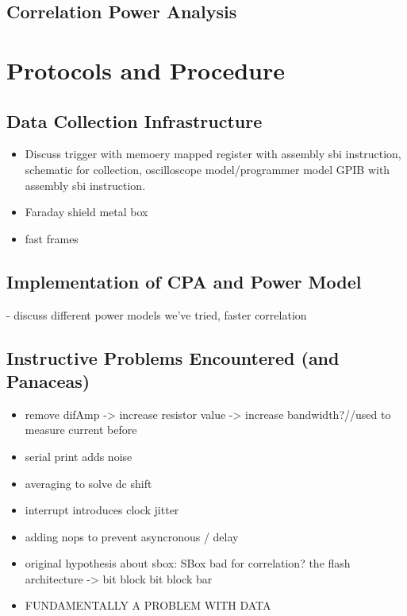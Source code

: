 \documentclass[journal]{ieee_style}
\begin{document}
\subsection{Correlation Power Analysis}

\section{Protocols and Procedure}

\subsection{Data Collection Infrastructure}
\begin{itemize}[-]
    \item Discuss trigger with memoery mapped register with assembly sbi instruction, schematic for collection, oscilloscope model/programmer model GPIB with assembly sbi instruction. 
\item Faraday shield metal box
\item fast frames
\end{itemize}

\subsection{Implementation of CPA and Power Model}
- discuss different power models we've tried, faster correlation

\subsection{Instructive Problems Encountered (and Panaceas)}


\begin{itemize}[-]
\item remove difAmp -> increase resistor value -> increase bandwidth?//used to measure current before
\item serial print adds noise
\item averaging to solve dc shift
\item interrupt introduces clock jitter
\item adding nops to prevent asyncronous / delay
\item original hypothesis about sbox:  SBox bad for correlation? the flash architecture -> bit block bit block bar
\item FUNDAMENTALLY A PROBLEM WITH DATA
\end{itemize}
\end{document}
